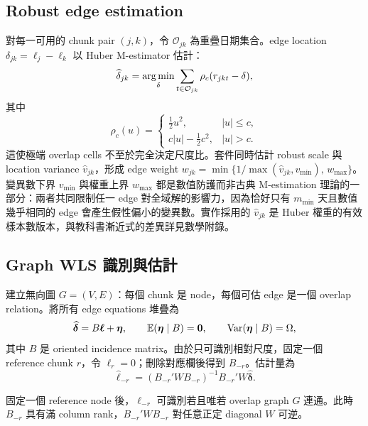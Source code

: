 \documentclass[12pt,a4paper,oneside]{article}
\begin{document}
\subsection{Robust edge estimation}

對每一可用的 chunk pair $(j,k)$，令 $\mathcal{O}_{jk}$ 為重疊日期集合。edge location $\delta_{jk}=\ell_j-\ell_k$ 以 Huber M-estimator 估計：
\begin{equation}
\widehat\delta_{jk}
=\operatorname*{arg\,min}_{\delta}\sum_{t\in\mathcal{O}_{jk}}
\rho_c(r_{jkt}-\delta),
\end{equation}
其中
\begin{equation}
\rho_c(u)=
\begin{cases}
\frac{1}{2}u^2, & |u|\le c,\\
c|u|-\frac{1}{2}c^2, & |u|>c.
\end{cases}
\end{equation}
這使極端 overlap cells 不至於完全決定尺度比。套件同時估計 robust scale 與 location variance $\widehat v_{jk}$，形成 edge weight $w_{jk}=\min\{1/\max(\widehat v_{jk},v_{\min}),\,w_{\max}\}$。變異數下界 $v_{\min}$ 與權重上界 $w_{\max}$ 都是數值防護而非古典 M-estimation 理論的一部分：兩者共同限制任一 edge 對全域解的影響力，因為恰好只有 $m_{\min}$ 天且數值幾乎相同的 edge 會產生假性偏小的變異數。實作採用的 $\widehat v_{jk}$ 是 Huber 權重的有效樣本數版本，與教科書漸近式的差異詳見數學附錄。

\subsection{Graph WLS 識別與估計}

建立無向圖 $G=(V,E)$：每個 chunk 是 node，每個可估 edge 是一個 overlap relation。將所有 edge equations 堆疊為
\begin{equation}
\widehat{\bm\delta}=B\bm\ell+\bm\eta,
\qquad \mathbb{E}(\bm\eta\mid B)=\bm 0,
\qquad \operatorname{Var}(\bm\eta\mid B)=\Omega,
\label{eq:graphlinear}
\end{equation}
其中 $B$ 是 oriented incidence matrix。由於只可識別相對尺度，固定一個 reference chunk $r$，令 $\ell_r=0$；刪除對應欄後得到 $B_{-r}$。估計量為
\begin{equation}
\widehat{\bm\ell}_{-r}
=(B_{-r}'WB_{-r})^{-1}B_{-r}'W\widehat{\bm\delta}.
\label{eq:graphwls}
\end{equation}

\begin{proposition}[相對尺度的識別]
固定一個 reference node 後，$\bm\ell_{-r}$ 可識別若且唯若 overlap graph $G$ 連通。此時 $B_{-r}$ 具有滿 column rank，$B_{-r}'WB_{-r}$ 對任意正定 diagonal $W$ 可逆。
\end{proposition}
\end{document}
